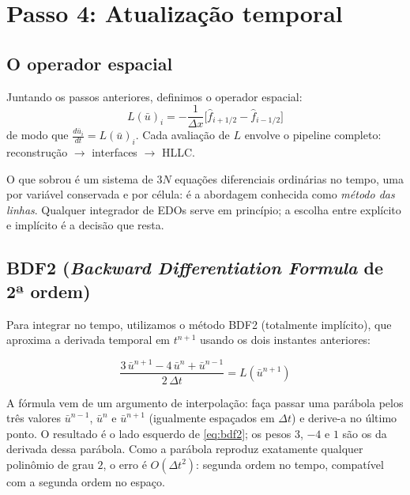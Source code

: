 \documentclass[10pt,a4paper]{article}
\newcommand{\fh}{\hat f}
\newcommand{\ub}{\bar u}
\begin{document}
\section{Passo 4: Atualização temporal}

\subsection{O operador espacial}

Juntando os passos anteriores, definimos o operador espacial:
\begin{equation}\label{eq:L}
L(\ub)_i=-\frac{1}{\Delta x}\Big[\fh_{i+1/2}-\fh_{i-1/2}\Big]
\end{equation}
de modo que $\frac{d\ub_i}{dt}=L(\ub)_i$. Cada avaliação de $L$ envolve o pipeline completo: reconstrução $\to$ interfaces $\to$ HLLC.

O que sobrou é um sistema de $3N$ equações diferenciais ordinárias no tempo, uma por variável conservada e por célula: é a abordagem conhecida como \emph{método das linhas}. Qualquer integrador de EDOs serve em princípio; a escolha entre explícito e implícito é a decisão que resta.

\subsection{BDF2 (\emph{Backward Differentiation Formula} de 2ª ordem)}

Para integrar no tempo, utilizamos o método BDF2 (totalmente implícito), que aproxima a derivada temporal em $t^{n+1}$ usando os dois instantes anteriores:
\begin{destaque}
\begin{equation}\label{eq:bdf2}
\frac{3\,\ub^{n+1}-4\,\ub^n+\ub^{n-1}}{2\,\Delta t}=L(\ub^{n+1})
\end{equation}
\end{destaque}

A fórmula vem de um argumento de interpolação: faça passar uma parábola pelos três valores $\ub^{n-1}$, $\ub^n$ e $\ub^{n+1}$ (igualmente espaçados em $\Delta t$) e derive-a no último ponto. O resultado é o lado esquerdo de \eqref{eq:bdf2}; os pesos $3$, $-4$ e $1$ são os da derivada dessa parábola. Como a parábola reproduz exatamente qualquer polinômio de grau $2$, o erro é $O(\Delta t^2)$: segunda ordem no tempo, compatível com a segunda ordem no espaço.
\end{document}
